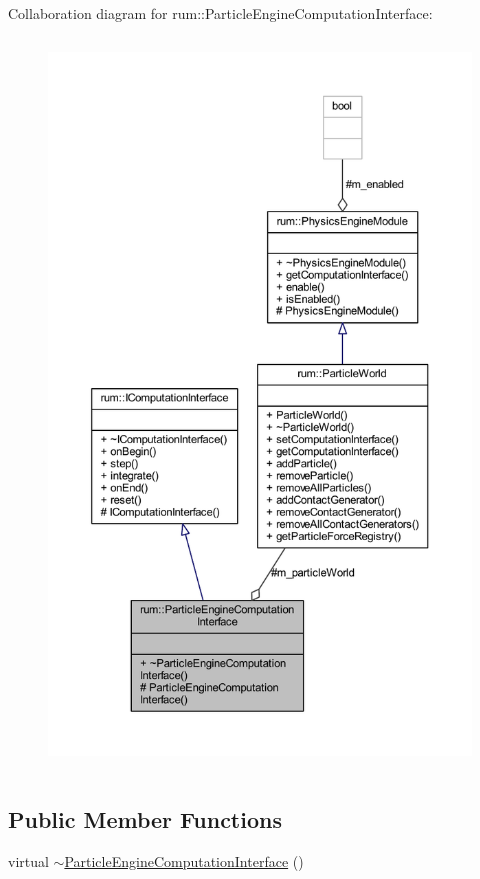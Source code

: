 Collaboration diagram for rum\+:\+:Particle\+Engine\+Computation\+Interface\+:\nopagebreak
\begin{figure}[H]
\begin{center}
\leavevmode
\includegraphics[height=550pt]{classrum_1_1_particle_engine_computation_interface__coll__graph}
\end{center}
\end{figure}
\subsection*{Public Member Functions}
\begin{DoxyCompactItemize}
\item 
virtual \mbox{\hyperlink{classrum_1_1_particle_engine_computation_interface_a97b19bc41506e144f85836e6036a9d0d}{$\sim$\+Particle\+Engine\+Computation\+Interface}} ()
\end{DoxyCompactItemize}
